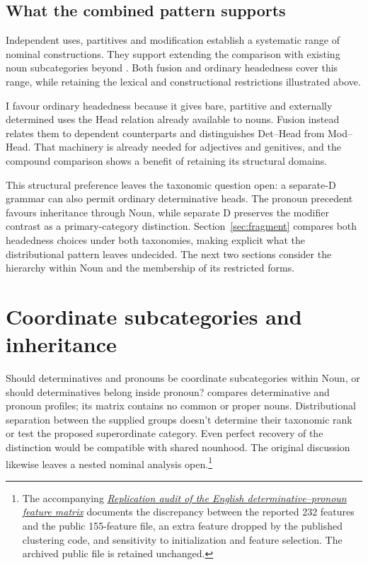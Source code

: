 \documentclass[12pt]{article}
\begin{document}
\subsection{What the combined pattern supports}\label{sec:cumulative}

Independent uses, partitives and modification establish a systematic range of nominal constructions. They support extending the comparison with existing noun subcategories beyond . Both fusion and ordinary headedness cover this range, while retaining the lexical and constructional restrictions illustrated above.

I favour ordinary headedness because it gives bare, partitive and externally determined uses the Head relation already available to nouns. Fusion instead relates them to dependent counterparts and distinguishes Det--Head from Mod--Head. That machinery is already needed for adjectives and genitives, and the compound comparison shows a benefit of retaining its structural domains.

This structural preference leaves the taxonomic question open: a separate-D grammar can also permit ordinary determinative heads. The pronoun precedent favours inheritance through Noun, while separate D preserves the modifier contrast as a primary-category distinction. Section~\ref{sec:fragment} compares both headedness choices under both taxonomies, making explicit what the distributional pattern leaves undecided. The next two sections consider the hierarchy within Noun and the membership of its restricted forms.

\section{Coordinate subcategories and inheritance}\label{sec:inheritance}

Should determinatives and pronouns be coordinate subcategories within Noun, or should determinatives belong inside pronoun? \textcite{reynolds2021} compares determinative and pronoun profiles; its matrix contains no common or proper nouns. Distributional separation between the supplied groups doesn't determine their taxonomic rank or test the proposed superordinate category. Even perfect recovery of the distinction would be compatible with shared nounhood. The original discussion likewise leaves a nested nominal analysis open.\footnote{The accompanying \href{run:matrix-audit.pdf}{\textit{Replication audit of the English determinative--pronoun feature matrix}} documents the discrepancy between the reported 232 features and the public 155-feature file, an extra feature dropped by the published clustering code, and sensitivity to initialization and feature selection. The archived public file is retained unchanged.}
\end{document}
